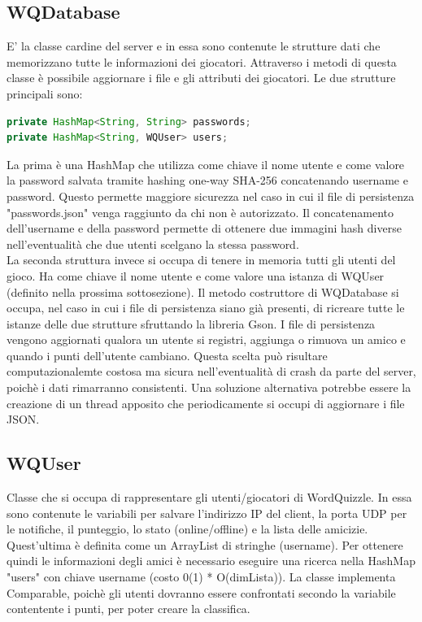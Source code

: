 \documentclass{article}
\begin{document}
\subsection{WQDatabase}
E' la classe cardine del server e in essa sono contenute le strutture dati che memorizzano tutte le informazioni dei giocatori. Attraverso i metodi di questa classe è possibile aggiornare i file e gli attributi dei giocatori. Le due strutture principali sono:
\begin{lstlisting}[language=Java]
private HashMap<String, String> passwords;
private HashMap<String, WQUser> users;
\end{lstlisting}
La prima è una HashMap che utilizza come chiave il nome utente e come valore la password salvata tramite hashing one-way SHA-256 concatenando username e password. Questo permette maggiore sicurezza nel caso in cui il file di persistenza "passwords.json" venga raggiunto da chi non è autorizzato. Il concatenamento dell'username e della password permette di ottenere due immagini hash diverse nell'eventualità che due utenti scelgano la stessa password. \\
La seconda struttura invece si occupa di tenere in memoria tutti gli utenti del gioco. Ha come chiave il nome utente e come valore una istanza di WQUser (definito nella prossima sottosezione). 
Il metodo costruttore di WQDatabase si occupa, nel caso in cui i file di persistenza siano già presenti, di ricreare tutte le istanze delle due strutture sfruttando la libreria Gson. I file di persistenza vengono aggiornati qualora un utente si registri, aggiunga o rimuova un amico e quando i punti dell'utente cambiano. Questa scelta può risultare computazionalemte costosa ma sicura nell'eventualità di crash da parte del server, poichè i dati rimarranno consistenti. Una soluzione alternativa potrebbe essere la creazione di un thread apposito che periodicamente si occupi di aggiornare i file JSON.

\subsection{WQUser}
Classe che si occupa di rappresentare gli utenti/giocatori di WordQuizzle. In essa sono contenute le variabili per salvare l'indirizzo IP del client, la porta UDP per le notifiche, il punteggio, lo stato (online/offline) e la lista delle amicizie. Quest'ultima è definita come un ArrayList di stringhe (username). Per ottenere quindi le informazioni degli amici è necessario eseguire una ricerca nella HashMap "users" con chiave username (costo 0(1) * O(dimLista)). La classe implementa Comparable, poichè gli utenti dovranno essere confrontati secondo la variabile contentente i punti, per poter creare la classifica.
\end{document}
